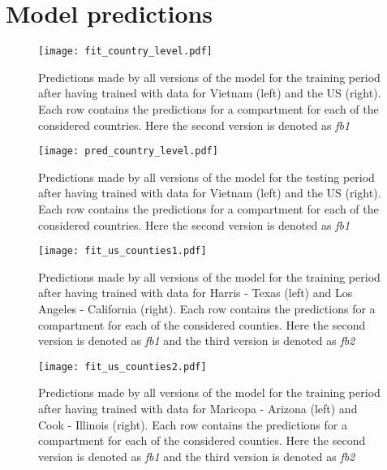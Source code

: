 \appendix

\chapter{Model predictions}

\begin{figure}[!htb]
    \centering
    \texttt{[image: fit\_country\_level.pdf]}
    \caption[Model fit for country-level data]{Predictions made by all versions of the model for the training period after having trained with data for Vietnam (left) and the US (right). Each row contains the predictions for a compartment for each of the considered countries. Here the second version is denoted as \textit{fb1}}
    \label{fig:fit-country-level}
\end{figure}

\begin{figure}[!htb]
    \centering
    \texttt{[image: pred\_country\_level.pdf]}
    \caption[Model forecast for country-level data]{Predictions made by all versions of the model for the testing period after having trained with data for Vietnam (left) and the US (right). Each row contains the predictions for a compartment for each of the considered countries. Here the second version is denoted as \textit{fb1}}
    \label{fig:pred-country-level}
\end{figure}

\begin{figure}[!htb]
    \centering
    \texttt{[image: fit\_us\_counties1.pdf]}
    \caption[Model fit for US counties 1]{Predictions made by all versions of the model for the training period after having trained with data for Harris - Texas (left) and Los Angeles - California (right). Each row contains the predictions for a compartment for each of the considered counties. Here the second version is denoted as \textit{fb1} and the third version is denoted as \textit{fb2}}
    \label{fig:fit-us-counties1}
\end{figure}

\begin{figure}[!htb]
    \centering
    \texttt{[image: fit\_us\_counties2.pdf]}
    \caption[Model fit for US counties 2]{Predictions made by all versions of the model for the training period after having trained with data for Maricopa - Arizona (left) and Cook - Illinois (right). Each row contains the predictions for a compartment for each of the considered counties. Here the second version is denoted as \textit{fb1} and the third version is denoted as \textit{fb2}}
    \label{fig:fit-us-counties2}
\end{figure}

